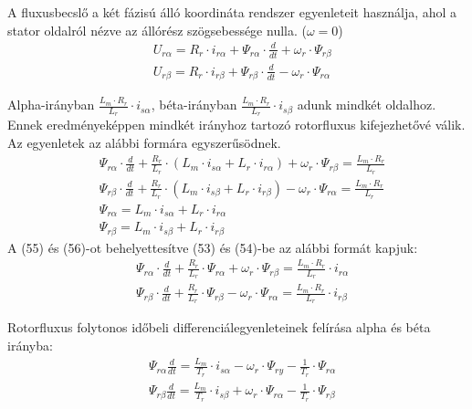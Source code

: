 \documentclass[a4paper,12pt]{article}
\begin{document}
		A fluxusbecslő a két fázisú álló koordináta rendszer egyenleteit használja, ahol a stator oldalról nézve az állórész szögsebessége nulla. ($\omega = 0 $)
		\begin{align}
			& U_{r\alpha} = R_r \cdot i_{r\alpha} + \Psi_{r\alpha} \cdot \frac{d}{dt} + \omega_{r} \cdot \Psi_{r\beta} \\
			& U_{r\beta} = R_r \cdot i_{r\beta}  + \Psi_{r\beta}  \cdot \frac{d}{dt} - \omega_{r} \cdot \Psi_{r\alpha} 	
		\end{align}	
		
		Alpha-irányban  $ \frac{L_m \cdot R_r}{L_r} \cdot i_{s\alpha} $, béta-irányban  $ \frac{L_m \cdot R_r}{L_r} \cdot i_{s\beta} $ adunk mindkét oldalhoz. Ennek eredményeképpen mindkét irányhoz tartozó rotorfluxus kifejezhetővé válik. Az egyenletek az alábbi formára egyszerűsödnek.
		\begin{align}
			& \Psi_{r\alpha} \cdot \frac{d}{dt} +  \frac{R_r}{L_r} \cdot (L_m \cdot i_{s\alpha} + L_r \cdot i_{r\alpha}) + \omega_r \cdot \Psi_{r\beta}  = \frac{L_m \cdot R_r}{L_r} \\
			& \Psi_{r\beta} \cdot \frac{d}{dt} +  \frac{R_r}{L_r} \cdot (L_m \cdot i_{s\beta}  + L_r \cdot i_{r\beta} ) - \omega_r \cdot \Psi_{r\alpha} = \frac{L_m \cdot R_r}{L_r}\\
			& \Psi_{r\alpha} = L_m \cdot i_{s\alpha}   + L_r  \cdot i_{r\alpha} \\
			& \Psi_{r\beta} = L_m \cdot i_{s\beta}  + L_r  \cdot i_{r\beta} 
		\end{align}
		A (55) és (56)-ot behelyettesítve (53) és (54)-be az alábbi formát kapjuk:
		\begin{align}
			& \Psi_{r\alpha} \cdot \frac{d}{dt} +  \frac{R_r}{L_r} \cdot \Psi_{r\alpha} + \omega_r \cdot \Psi_{r\beta} = \frac{L_m \cdot R_r}{L_r} \cdot i_{r\alpha}  \\
			& \Psi_{r\beta} \cdot \frac{d}{dt} +  \frac{R_r}{L_r} \cdot \Psi_{r\beta} - \omega_r \cdot \Psi_{r\alpha} = \frac{L_m \cdot R_r}{L_r} \cdot i_{r\beta} 
		\end{align}
		
		Rotorfluxus folytonos időbeli differenciálegyenleteinek felírása alpha és béta irányba:
		\begin{align}
			& \Psi_{r\alpha}\frac{d}{dt} = \frac{L_m}{T_r} \cdot i_{s\alpha} - \omega_r \cdot \Psi_{ry} - \frac{1}{T_r} \cdot \Psi_{r\alpha} \\
			& \Psi_{r\beta} \frac{d}{dt} = \frac{L_m}{T_r} \cdot i_{s\beta} + \omega_r \cdot \Psi_{r\alpha} - \frac{1}{T_r} \cdot \Psi_{r\beta}
		\end{align}
		
\end{document}
